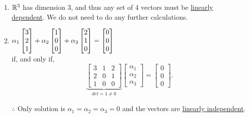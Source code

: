 \documentclass[letterpaper]{article}
\begin{document}
\begin{enumerate}
\item $\mathbb R^3$ has dimension 3, and thus any set of 4 vectors must be \underline{linearly dependent}. We do not need to do any further calculations.

\item $\hfill \alpha_1 \begin{bmatrix} 3 \\ 2 \\ 1 \end{bmatrix} + \alpha_2 \begin{bmatrix} 1 \\ 0 \\ 0 \end{bmatrix} + \alpha_3 \begin{bmatrix} 2 \\ 1 \\ 0 \end{bmatrix} = \begin{bmatrix} 0 \\ 0 \\ 0 \end{bmatrix} \hfill$ \\
if, and only if,
$$\underbrace{\left[ \begin{array}{ccc}3 & 1 & 2 \\ 2 & 0 & 1 \\ 1 & 0 & 0 \end{array} \right]}_{det=1\neq0 } \begin{bmatrix} \alpha_1 \\ \alpha_2 \\ \alpha_3 \end{bmatrix} = \begin{bmatrix} 0 \\ 0 \\ 0 \end{bmatrix}. $$

$\therefore$ Only solution is $\alpha_1=\alpha_2=\alpha_3=0$ and the vectors are \underline{linearly independent}.
\end{enumerate}
\end{document}

